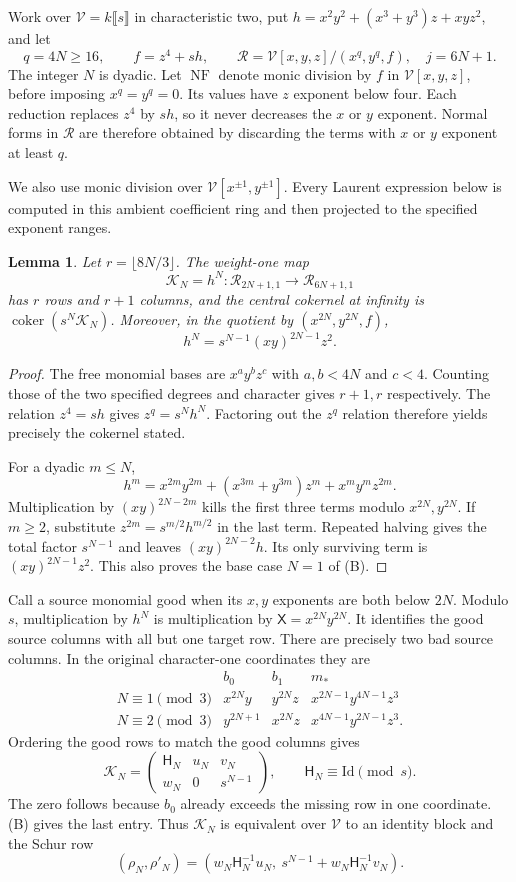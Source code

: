 \documentclass[11pt,a4paper,reqno]{amsart}
\numberwithin{equation}{section}
\theoremstyle{plain}
\newtheorem{lemma}[theorem]{Lemma}
\theoremstyle{definition}
\theoremstyle{remark}
\newcommand{\Id}{\mathrm{Id}}
\DeclareMathOperator{\coker}{coker}
\DeclareMathOperator{\NF}{NF}
\begin{document}
Work over $\mathcal V=k\llbracket s\rrbracket$ in characteristic two, put $h=x^2y^2+(x^3+y^3)z+xyz^2$, and let
\[
q=4N\geq16,\qquad f=z^4+sh,\qquad
\mathcal R=\mathcal V[x,y,z]/(x^q,y^q,f),\quad j=6N+1.
\]
The integer $N$ is dyadic. Let $\NF$ denote monic division by $f$ in
$\mathcal V[x,y,z]$, before imposing $x^q=y^q=0$. Its values have $z$
exponent below four. Each reduction replaces $z^4$ by $sh$, so it never
decreases the $x$ or $y$ exponent. Normal forms in $\mathcal R$ are
therefore obtained by discarding the terms with $x$ or $y$ exponent at
least $q$.

We also use monic division over
$\mathcal V[x^{\pm1},y^{\pm1}]$. Every Laurent expression below is
computed in this ambient coefficient ring and then projected to the
specified exponent ranges.

\begin{lemma}
Let $r=\lfloor8N/3\rfloor$. The weight-one map
\[
\mathcal K_N=h^N:\mathcal R_{2N+1,1}\longrightarrow\mathcal R_{6N+1,1}
\]
has $r$ rows and $r+1$ columns, and the central cokernel at infinity is $\coker(s^N\mathcal K_N)$. Moreover, in the quotient by $(x^{2N},y^{2N},f)$,
\[
h^N=s^{N-1}(xy)^{2N-1}z^2.
\tag{B}
\]
\end{lemma}
\begin{proof}
The free monomial bases are $x^ay^bz^c$ with $a,b<4N$ and $c<4$. Counting those of the two specified degrees and character gives $r+1,r$ respectively. The relation $z^4=sh$ gives $z^q=s^Nh^N$. Factoring out the $z^q$ relation therefore yields precisely the cokernel stated.

For a dyadic $m\leq N$,
\[
h^m=x^{2m}y^{2m}+(x^{3m}+y^{3m})z^m+x^my^mz^{2m}.
\]
Multiplication by $(xy)^{2N-2m}$ kills the first three terms modulo $x^{2N},y^{2N}$. If $m\geq2$, substitute $z^{2m}=s^{m/2}h^{m/2}$ in the last term. Repeated halving gives the total factor $s^{N-1}$ and leaves $(xy)^{2N-2}h$. Its only surviving term is $(xy)^{2N-1}z^2$. This also proves the base case $N=1$ of (B).
\end{proof}

Call a source monomial good when its $x,y$ exponents are both below $2N$. Modulo $s$, multiplication by $h^N$ is multiplication by $\mathsf X=x^{2N}y^{2N}$. It identifies the good source columns with all but one target row. There are precisely two bad source columns. In the original character-one coordinates they are
\[
\begin{array}{c|ccc}
&b_0&b_1&m_*\\\hline
N\equiv1\pmod3&x^{2N}y&y^{2N}z&x^{2N-1}y^{4N-1}z^3\\
N\equiv2\pmod3&y^{2N+1}&x^{2N}z&x^{4N-1}y^{2N-1}z^3.
\end{array}
\]
Ordering the good rows to match the good columns gives
\[
\mathcal K_N=\begin{pmatrix}\mathsf H_N&u_N&v_N\\w_N&0&s^{N-1}\end{pmatrix},\qquad \mathsf H_N\equiv \Id\pmod s.
\]
The zero follows because $b_0$ already exceeds the missing row in one coordinate. (B) gives the last entry. Thus $\mathcal K_N$ is equivalent over $\mathcal V$ to an identity block and the Schur row
\[
(\rho_N,\rho'_N)=
(w_N\mathsf H_N^{-1}u_N,\ s^{N-1}+w_N\mathsf H_N^{-1}v_N).
\]
\end{document}
